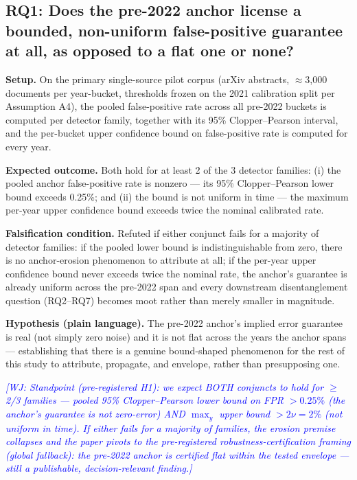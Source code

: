 \documentclass[conference]{IEEEtran}
\newcommand{\wj}[1]{\textcolor{blue}{\emph{[WJ: #1]}}}
\begin{document}
\subsection{RQ1: Does the pre-2022 anchor license a bounded, non-uniform false-positive guarantee at all, as opposed to a flat one or none?}

\textbf{Setup.} On the primary single-source pilot corpus (arXiv abstracts, $\approx$3,000 documents per year-bucket, thresholds frozen on the 2021 calibration split per Assumption A4), the pooled false-positive rate across all pre-2022 buckets is computed per detector family, together with its 95\% Clopper--Pearson interval, and the per-bucket upper confidence bound on false-positive rate is computed for every year.

\textbf{Expected outcome.} Both hold for at least 2 of the 3 detector families: (i) the pooled anchor false-positive rate is nonzero --- its 95\% Clopper--Pearson lower bound exceeds 0.25\%; and (ii) the bound is not uniform in time --- the maximum per-year upper confidence bound exceeds twice the nominal calibrated rate.

\textbf{Falsification condition.} Refuted if either conjunct fails for a majority of detector families: if the pooled lower bound is indistinguishable from zero, there is no anchor-erosion phenomenon to attribute at all; if the per-year upper confidence bound never exceeds twice the nominal rate, the anchor's guarantee is already uniform across the pre-2022 span and every downstream disentanglement question (RQ2--RQ7) becomes moot rather than merely smaller in magnitude.

\textbf{Hypothesis (plain language).} The pre-2022 anchor's implied error guarantee is real (not simply zero noise) and it is not flat across the years the anchor spans --- establishing that there is a genuine bound-shaped phenomenon for the rest of this study to attribute, propagate, and envelope, rather than presupposing one.

\wj{Standpoint (pre-registered H1): we expect BOTH conjuncts to hold for $\geq$2/3 families --- pooled 95\% Clopper--Pearson lower bound on FPR $>0.25\%$ (the anchor's guarantee is not zero-error) AND $\max_y$ upper bound $>2\nu=2\%$ (not uniform in time). If either fails for a majority of families, the erosion premise collapses and the paper pivots to the pre-registered robustness-certification framing (global fallback): the pre-2022 anchor is certified flat within the tested envelope --- still a publishable, decision-relevant finding.}
\end{document}
